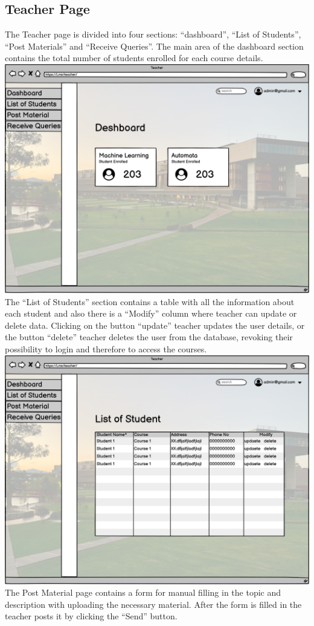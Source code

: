 \newpage
\subsection{Teacher Page}
The Teacher page is divided into four sections: “dashboard”, “List of Students”, “Post Materials” and “Receive Queries”. The main area of the dashboard section contains the total number of students enrolled for each course details.\\

\includegraphics[width=\columnwidth]{images/Teacher Deshboard.png}
\newpage
The “List of Students” section contains a table  with all the information about each student and also there is a “Modify” column where teacher can update or delete data.  Clicking on the button “update” teacher updates the user details, or the button “delete” teacher deletes the user from the database, revoking their possibility to login and therefore to access the courses.\\

\includegraphics[width=\columnwidth]{images/List of Students teacher.png}
\newpage
The Post Material page contains a form for manual filling in the topic and description with uploading the necessary material. After the form is filled in the teacher posts it by clicking the “Send” button.\\

